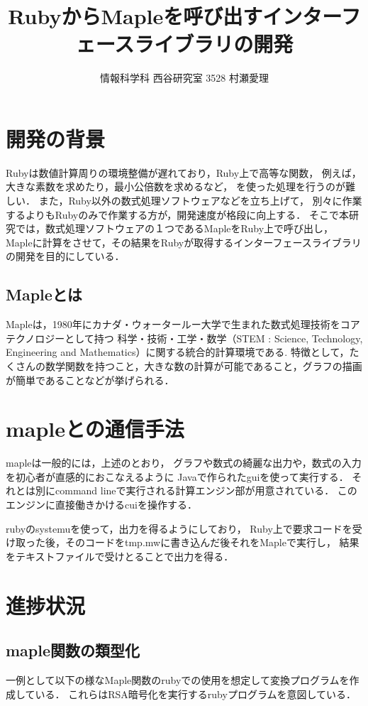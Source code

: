 \documentclass[10pt,a4j,twocolumn]{jsarticle}
\begin{document}
\title{RubyからMapleを呼び出すインターフェースライブラリの開発}
\author{情報科学科 西谷研究室 3528 村瀬愛理}
\date{}
\maketitle
\section{開発の背景}
Rubyは数値計算周りの環境整備が遅れており，Ruby上で高等な関数，
例えば，大きな素数を求めたり，最小公倍数を求めるなど，
を使った処理を行うのが難しい．
また，Ruby以外の数式処理ソフトウェアなどを立ち上げて，
別々に作業するよりもRubyのみで作業する方が，開発速度が格段に向上する．
そこで本研究では，数式処理ソフトウェアの１つであるMapleをRuby上で呼び出し，
Mapleに計算をさせて，その結果をRubyが取得するインターフェースライブラリの開発を目的にしている．

\subsection{Mapleとは}
Mapleは，1980年にカナダ・ウォータールー大学で生まれた数式処理技術をコアテクノロジーとして持つ
科学・技術・工学・数学（STEM : Science, Technology, Engineering and Mathematics）に関する統合的計算環境である\cite{Maple}.
特徴として，たくさんの数学関数を持つこと，大きな数の計算が可能であること，グラフの描画が簡単であることなどが挙げられる．

\section{mapleとの通信手法}
mapleは一般的には，上述のとおり，
グラフや数式の綺麗な出力や，数式の入力を初心者が直感的におこなえるように
Javaで作られたguiを使って実行する．
それとは別にcommand lineで実行される計算エンジン部が用意されている．
このエンジンに直接働きかけるcuiを操作する．

rubyのsystemuを使って，出力を得るようにしており，
Ruby上で要求コードを受け取った後，そのコードをtmp.mwに書き込んだ後それをMapleで実行し，
結果をテキストファイルで受けとることで出力を得る．

\section{進捗状況}
\subsection{maple関数の類型化}
一例として以下の様なMaple関数のrubyでの使用を想定して変換プログラムを作成している．
これらはRSA暗号化を実行するrubyプログラムを意図している．
\end{document}
